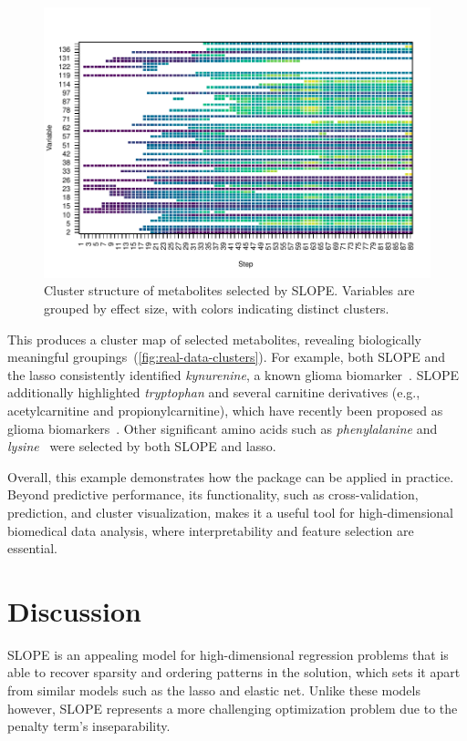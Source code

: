 \documentclass[article]{jss}
\begin{document}
\begin{figure}[tp]
  \centering
  \includegraphics[width=\textwidth]{images/glioma-clusters.pdf}
  \caption{Cluster structure of metabolites selected by SLOPE. Variables are
    grouped by effect size, with colors indicating distinct clusters.}
  \label{fig:real-data-clusters}
\end{figure}

This produces a cluster map of selected metabolites, revealing biologically
meaningful groupings~(\autoref{fig:real-data-clusters}). For example, both
SLOPE and the lasso consistently identified \textit{kynurenine}, a known glioma
biomarker~\citep{du2020both}. SLOPE additionally highlighted
\textit{tryptophan} and several carnitine derivatives (e.g., acetylcarnitine
and propionylcarnitine), which have recently been proposed as glioma
biomarkers~\citep{wang2024genomic}. Other significant amino acids such as
\textit{phenylalanine} and \textit{lysine}~\citep{koslinski2023comparative,
  srivastava2025amino} were selected by both SLOPE and lasso.

Overall, this example demonstrates how the package can be applied in practice.
Beyond predictive performance, its functionality, such as cross-validation,
prediction, and cluster visualization, makes it a useful tool for
high-dimensional biomedical data analysis, where interpretability and feature
selection are essential.

\section{Discussion}\label{sec:discussion}

SLOPE is an appealing model for high-dimensional regression problems that is
able to recover sparsity and ordering patterns in the solution, which sets it
apart from similar models such as the lasso and elastic net. Unlike these models
however, SLOPE represents a more challenging optimization problem due to the
penalty term's inseparability.
\end{document}
